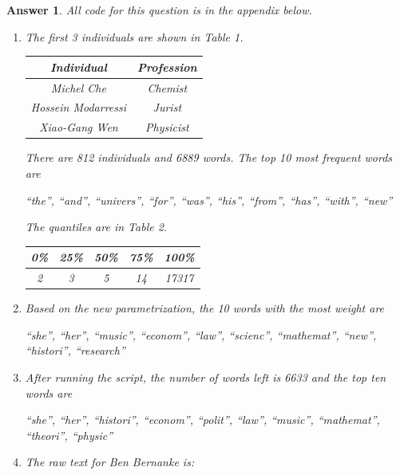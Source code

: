 \documentclass[12pt]{article}
\theoremstyle{colon}
\newtheorem*{answer}{Answer}
\begin{document}
\begin{answer}
  All code for this question is in the appendix below.
  \begin{enumerate}[label=\arabic*)]
    \item The first 3 individuals are shown in Table 1.
      \begin{center}
        \begin{tabular}{ c | c }
          Individual & Profession \\
          \hline
          Michel Che & Chemist \\
          Hossein Modarressi & Jurist \\
          Xiao-Gang Wen & Physicist
        \end{tabular}
      \end{center}
      There are 812 individuals and 6889 words. The top 10 most frequent words are
      \begin{center}
        ``the'', ``and'', ``univers'', ``for'', ``was'', ``his'', ``from'', ``has'', ``with'', ``new''
      \end{center}
      The quantiles are in Table 2.
      \begin{center}
        \begin{tabular}{ c | c | c | c | c}
          0\% & 25\% & 50\% & 75\% & 100\% \\
          \hline
          2 & 3 & 5 & 14 & 17317
        \end{tabular}
      \end{center}

    \item Based on the new parametrization, the 10 words with the most weight are
      \begin{center}
        ``she'', ``her'', ``music'', ``econom'', ``law'', ``scienc'', ``mathemat'', ``new'', ``histori'', ``research''
      \end{center}

    \item After running the script, the number of words left is 6633 and the top ten words are
      \begin{center}
        ``she'', ``her'', ``histori'', ``econom'', ``polit'', ``law'', ``music'', ``mathemat'', ``theori'', ``physic''
      \end{center}

    \item The raw text for Ben Bernanke is:


\end{enumerate}
\end{answer}
\end{document}
